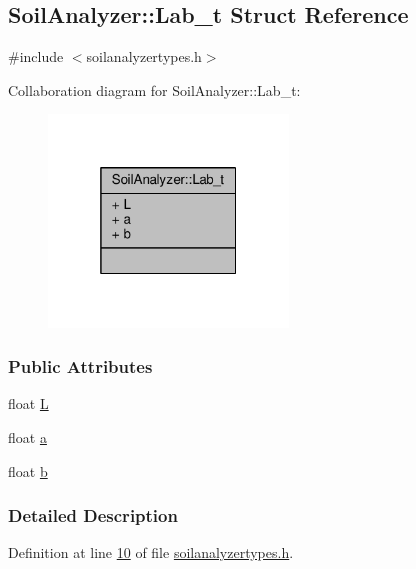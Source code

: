 \hypertarget{struct_soil_analyzer_1_1_lab__t}{}\subsection{Soil\+Analyzer\+:\+:Lab\+\_\+t Struct Reference}
\label{struct_soil_analyzer_1_1_lab__t}


{\ttfamily \#include $<$soilanalyzertypes.\+h$>$}



Collaboration diagram for Soil\+Analyzer\+:\+:Lab\+\_\+t\+:
\nopagebreak
\begin{figure}[H]
\begin{center}
\leavevmode
\includegraphics[width=181pt]{struct_soil_analyzer_1_1_lab__t__coll__graph}
\end{center}
\end{figure}
\subsubsection*{Public Attributes}
\begin{DoxyCompactItemize}
\item 
float \hyperlink{struct_soil_analyzer_1_1_lab__t_a95bd9662f683628a0ead6760bc194eaa}{L}
\item 
float \hyperlink{struct_soil_analyzer_1_1_lab__t_a2a956821f27c87aba8939183629f2782}{a}
\item 
float \hyperlink{struct_soil_analyzer_1_1_lab__t_ad703ecdb0a8024e21f8e2ae3c21d9ef2}{b}
\end{DoxyCompactItemize}


\subsubsection{Detailed Description}


Definition at line \hyperlink{soilanalyzertypes_8h_source_l00010}{10} of file \hyperlink{soilanalyzertypes_8h_source}{soilanalyzertypes.\+h}.



